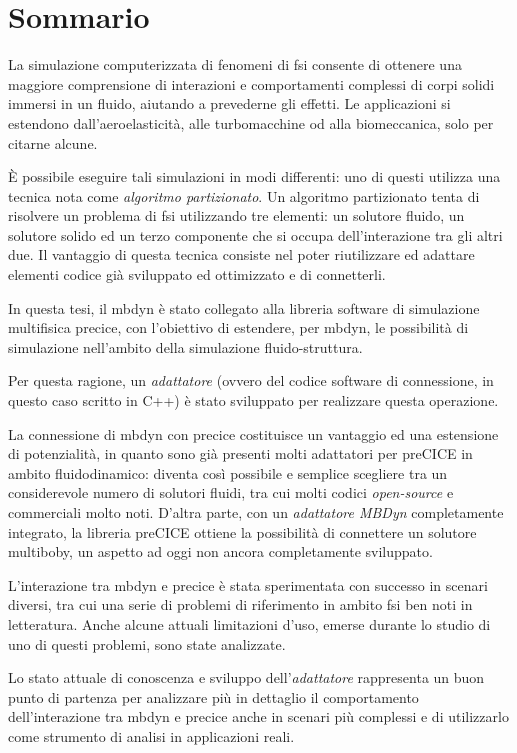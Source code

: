 \chapter*{Sommario}
\label{cha:sommario}


La simulazione computerizzata di fenomeni di \acrfull{fsi} consente di ottenere una maggiore comprensione di interazioni e comportamenti complessi di corpi solidi immersi in un fluido, aiutando a prevederne gli effetti. Le applicazioni si estendono dall'aeroelasticità, alle turbomacchine od alla biomeccanica, solo per citarne alcune.

\`E possibile eseguire tali simulazioni in modi differenti: uno di questi utilizza una tecnica nota come \textit{algoritmo partizionato}. Un algoritmo partizionato tenta di risolvere un problema di \acrshort{fsi} utilizzando tre elementi: un solutore fluido, un solutore solido ed un terzo componente che si occupa dell'interazione tra gli altri due. Il vantaggio di questa tecnica consiste nel poter riutilizzare ed adattare elementi codice già sviluppato ed ottimizzato e di connetterli. 

In questa tesi, il \acrfull{mbdyn} è stato collegato alla libreria software di simulazione multifisica \acrfull{precice}, con l'obiettivo di estendere, per \acrshort{mbdyn}, le possibilità di simulazione nell'ambito della simulazione fluido-struttura.

Per questa ragione, un \textit{adattatore} (ovvero del codice software di connessione, in questo caso scritto in C++) è stato sviluppato per realizzare questa operazione.

La connessione di \acrshort{mbdyn} con \acrshort{precice} costituisce un vantaggio ed una estensione di potenzialità, in quanto sono già presenti molti adattatori per preCICE in ambito fluidodina\-mico: diventa così possibile e semplice scegliere tra un considerevole numero di solutori fluidi, tra cui molti codici \textit{open-source} e commerciali molto noti. D'altra parte, con un \textit{adattatore MBDyn} completamente integrato, la libreria preCICE ottiene la possibilità di connettere un solutore multiboby, un aspetto ad oggi non ancora completamente sviluppato.

L'interazione tra \acrshort{mbdyn} e \acrshort{precice} è stata sperimentata con successo in scenari diversi, tra cui una serie di problemi di riferimento in ambito \acrshort{fsi} ben noti in letteratura. Anche alcune attuali limitazioni d'uso, emerse durante lo studio di uno di questi problemi, sono state analizzate. 

Lo stato attuale di conoscenza e sviluppo dell'\textit{adattatore} rappresenta un buon punto di partenza per analizzare più in dettaglio il comportamento dell'interazione tra \acrshort{mbdyn} e \acrshort{precice} anche in scenari più complessi e di utilizzarlo come strumento di analisi in applicazioni reali.


\vspace{5mm}


